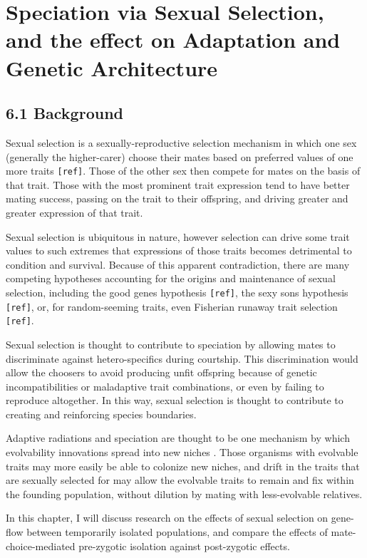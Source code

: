\section{Speciation via Sexual Selection, and the effect on Adaptation and Genetic Architecture}

\subsection{6.1 Background}

Sexual selection is a sexually-reproductive selection mechanism in which one sex (generally the higher-carer) choose their mates based on preferred values of one more traits \verb|[ref]|. Those of the other sex then compete for mates on the basis of that trait. Those with the most prominent trait expression tend to have better mating success, passing on the trait to their offspring, and driving greater and greater expression of that trait. 

Sexual selection is ubiquitous in nature, however selection can drive some trait values to such extremes that expressions of those traits becomes detrimental to condition and survival. Because of this apparent contradiction, there are many competing hypotheses accounting for the origins and maintenance of sexual selection, including the good genes hypothesis \verb|[ref]|, the sexy sons hypothesis \verb|[ref]|, or, for random-seeming traits, even Fisherian runaway trait selection \verb|[ref]|. 

Sexual selection is thought to contribute to speciation by allowing mates to discriminate against hetero-specifics during courtship. This discrimination would allow the choosers to avoid producing unfit offspring because of genetic incompatibilities or maladaptive trait combinations, or even by failing to reproduce altogether. In this way, sexual selection is thought to contribute to creating and reinforcing species boundaries.

Adaptive radiations and speciation are thought to be one mechanism by which evolvability innovations spread into new niches \cite{kirschner_evolvability_1998}\cite{dawkins_13_2003}. Those organisms with evolvable traits may more easily be able to colonize new niches, and drift in the traits that are sexually selected for may allow the evolvable traits to remain and fix within the founding population, without dilution by mating with less-evolvable relatives. 

In this chapter, I will discuss research on the effects of sexual selection on gene-flow between temporarily isolated populations, and compare the effects of mate-choice-mediated pre-zygotic isolation against post-zygotic effects.